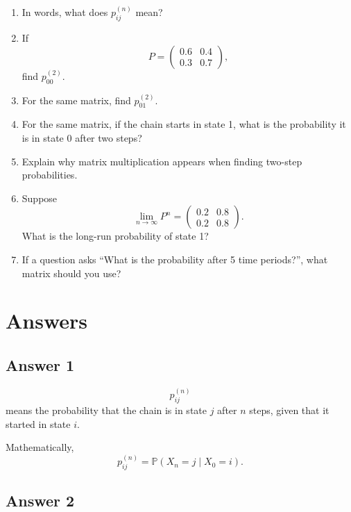 \documentclass[12pt,a4paper]{article}
\theoremstyle{notestyle}
\newcommand{\Prob}{\mathbb{P}}
\begin{document}
\begin{enumerate}[label=\textbf{Q\arabic*.}, leftmargin=1.2cm]
    \item In words, what does $p_{ij}^{(n)}$ mean?

    \item If
    \[
    P=
    \begin{pmatrix}
    0.6 & 0.4\\
    0.3 & 0.7
    \end{pmatrix},
    \]
    find $p_{00}^{(2)}$.

    \item For the same matrix, find $p_{01}^{(2)}$.

    \item For the same matrix, if the chain starts in state 1, what is the probability it is in state 0 after two steps?

    \item Explain why matrix multiplication appears when finding two-step probabilities.

    \item Suppose
    \[
    \lim_{n\to\infty}P^n=
    \begin{pmatrix}
    0.2 & 0.8\\
    0.2 & 0.8
    \end{pmatrix}.
    \]
    What is the long-run probability of state 1?

    \item If a question asks ``What is the probability after 5 time periods?'', what matrix should you use?
\end{enumerate}

\section{Answers}

\subsection*{Answer 1}

\[
p_{ij}^{(n)}
\]
means the probability that the chain is in state $j$ after $n$ steps, given that it started in state $i$.

Mathematically,
\[
p_{ij}^{(n)}=\Prob(X_n=j\mid X_0=i).
\]

\subsection*{Answer 2}
\end{document}
